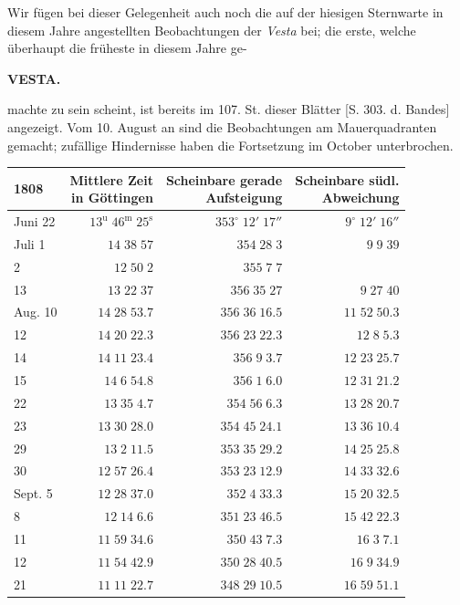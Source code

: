 \par\indent Wir fügen bei dieser Gelegenheit auch noch die auf der hiesigen Sternwarte in diesem Jahre angestellten Beobachtungen der \emph{Vesta} bei; die erste, welche überhaupt die früheste in diesem Jahre ge-
\par
\clearpage
\thispagestyle{empty}
\noindent{}%
\makebox[12mm][l]{}%
\parbox[t]{\dimexpr\linewidth-24mm\relax}{\centering\footnotesize\bfseries VESTA.\par}%
\par\nobreak\medskip
\noindent machte zu sein scheint, ist bereits im 107. St. dieser Blätter [S. 303. d. Bandes] angezeigt. Vom 10. August an sind die Beobachtungen am Mauerquadranten gemacht; zufällige Hindernisse haben die Fortsetzung im October unterbrochen.


\begin{center}\fontsize{10}{12}\selectfont\setlength{\tabcolsep}{5pt}\renewcommand{\arraystretch}{1.15}\begin{tabular}{lrrr}
1808 & \shortstack{Mittlere Zeit\\in Göttingen} & \shortstack{Scheinbare gerade\\Aufsteigung} & \shortstack{Scheinbare südl.\\Abweichung}\\
\hline
Juni 22 & $13^{\text{u}}\;46^{\text{m}}\;25^{\text{s}}$ & $353^\circ\;12'\;17''$ & $9^\circ\;12'\;16''$\\
Juli  1 & $14\;38\;57$ & $354\;28\;3$ & $9\;9\;39$\\
2 & $12\;50\;2$ & $355\;7\;7$ & \\
13 & $13\;22\;37$ & $356\;35\;27$ & $9\;27\;40$\\
Aug. 10 & $14\;28\;53.7$ & $356\;36\;16.5$ & $11\;52\;50.3$\\
12 & $14\;20\;22.3$ & $356\;23\;22.3$ & $12\;8\;5.3$\\
14 & $14\;11\;23.4$ & $356\;9\;3.7$ & $12\;23\;25.7$\\
15 & $14\;6\;54.8$ & $356\;1\;6.0$ & $12\;31\;21.2$\\
22 & $13\;35\;4.7$ & $354\;56\;6.3$ & $13\;28\;20.7$\\
23 & $13\;30\;28.0$ & $354\;45\;24.1$ & $13\;36\;10.4$\\
29 & $13\;2\;11.5$ & $353\;35\;29.2$ & $14\;25\;25.8$\\
30 & $12\;57\;26.4$ & $353\;23\;12.9$ & $14\;33\;32.6$\\
Sept. 5 & $12\;28\;37.0$ & $352\;4\;33.3$ & $15\;20\;32.5$\\
8 & $12\;14\;6.6$ & $351\;23\;46.5$ & $15\;42\;22.3$\\
11 & $11\;59\;34.6$ & $350\;43\;7.3$ & $16\;3\;7.1$\\
12 & $11\;54\;42.9$ & $350\;28\;40.5$ & $16\;9\;34.9$\\
21 & $11\;11\;22.7$ & $348\;29\;10.5$ & $16\;59\;51.1$\\
\end{tabular}\end{center}


